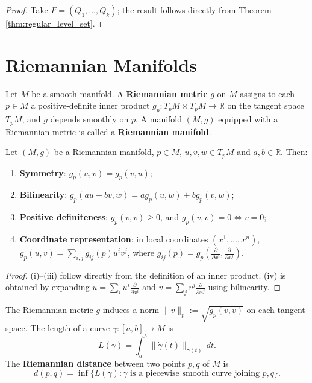 \begin{proof}
Take $F = (Q_1, \dots, Q_k)$; the result follows directly from Theorem \ref{thm:regular_level_set}.
\end{proof}

\section{Riemannian Manifolds}

\begin{definition}\label{def:riemannian_metric}
Let $M$ be a smooth manifold. A \textbf{Riemannian metric} $g$ on $M$ assigns to each $p \in M$ a positive-definite inner product $g_p: T_pM \times T_pM \to \mathbb{R}$ on the tangent space $T_pM$, and $g$ depends smoothly on $p$. A manifold $(M, g)$ equipped with a Riemannian metric is called a \textbf{Riemannian manifold}.
\end{definition}

\begin{property}\label{prop:riemannian_metric_properties}
Let $(M, g)$ be a Riemannian manifold, $p \in M$, $u, v, w \in T_pM$ and $a, b \in \mathbb{R}$. Then:
\begin{enumerate}[label=(\roman*)]
    \item \textbf{Symmetry}: $g_p(u, v) = g_p(v, u)$;
    \item \textbf{Bilinearity}: $g_p(au + bv, w) = a g_p(u, w) + b g_p(v, w)$;
    \item \textbf{Positive definiteness}: $g_p(v, v) \ge 0$, and $g_p(v, v) = 0 \iff v = 0$;
    \item \textbf{Coordinate representation}: in local coordinates $(x^1, \dots, x^n)$, $g_p(u, v) = \sum_{i,j} g_{ij}(p) u^i v^j$, where $g_{ij}(p) = g_p(\frac{\partial}{\partial x^i}, \frac{\partial}{\partial x^j})$.
\end{enumerate}
\end{property}

\begin{proof}
(i)--(iii) follow directly from the definition of an inner product. (iv) is obtained by expanding $u = \sum_i u^i \frac{\partial}{\partial x^i}$ and $v = \sum_j v^j \frac{\partial}{\partial x^j}$ using bilinearity.
\end{proof}

\begin{proposition}\label{prop:metric_norm}
The Riemannian metric $g$ induces a norm $\|v\|_p := \sqrt{g_p(v,v)}$ on each tangent space. The length of a curve $\gamma: [a,b] \to M$ is
\[
L(\gamma) = \int_a^b \|\dot{\gamma}(t)\|_{\gamma(t)}\, dt.
\]
The \textbf{Riemannian distance} between two points $p, q$ of $M$ is
\[
d(p,q) = \inf\{L(\gamma) : \gamma \text{ is a piecewise smooth curve joining } p, q\}.
\]
\end{proposition}

